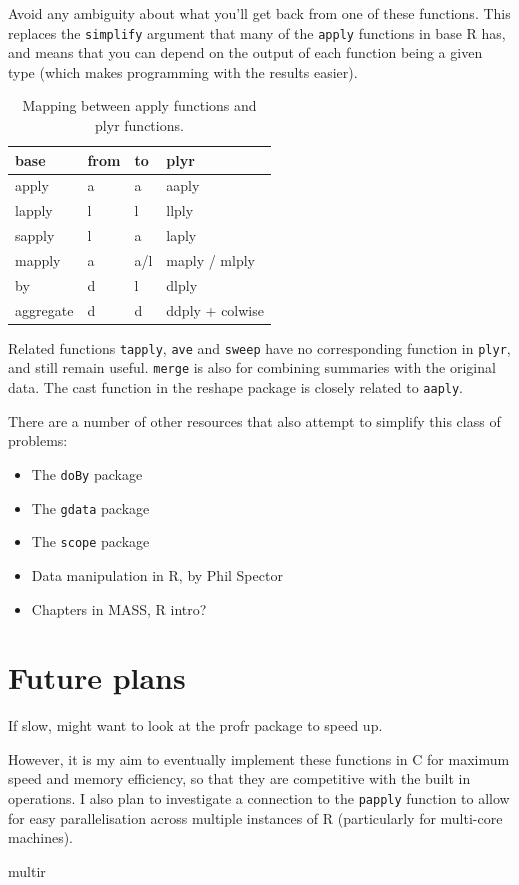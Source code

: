 \documentclass[letterpaper,oneside]{scrartcl}
\begin{document}
Avoid any ambiguity about what you'll get back from one of these functions. This replaces the {\tt simplify} argument that many of the {\tt apply} functions in base R has, and means that you can depend on the output of each function being a given type (which makes programming with the results easier).


\begin{table}[htpb]
  \begin{center}
  \begin{tabular}{llll}
    base & from & to & plyr \\
    \hline
    apply     & a & a   & aaply \\
    lapply    & l & l   & llply \\
    sapply    & l & a   & laply \\
    mapply    & a & a/l & maply / mlply \\
    by        & d & l   & dlply \\
    aggregate & d & d   & ddply + colwise \\
  \end{tabular}
  \end{center}
  \caption{Mapping between apply functions and plyr functions.}
  \label{tbl:equiv}
\end{table}

Related functions {\tt tapply}, {\tt ave} and {\tt sweep} have no corresponding function in {\tt plyr}, and still remain useful. {\tt merge} is also for combining summaries with the original data.  The cast function in the reshape package \citep{reshape} is closely related to {\tt aaply}.

There are a number of other resources that also attempt to simplify this class of problems:

\begin{itemize}
  \item The {\tt doBy} package
  \item The {\tt gdata} package
  \item The {\tt scope} package
  \item Data manipulation in R, by Phil Spector
  \item Chapters in MASS, R intro?
  
\end{itemize}

\section{Future plans}
\label{sec:future}

If slow, might want to look at the profr package to speed up.  

However, it is my aim to eventually implement these functions in C for maximum speed and memory efficiency, so that they are competitive with the built in operations.  I also plan to investigate a connection to the {\tt papply} function to allow for easy parallelisation across multiple instances of R (particularly for multi-core machines).

multir


\end{document}
